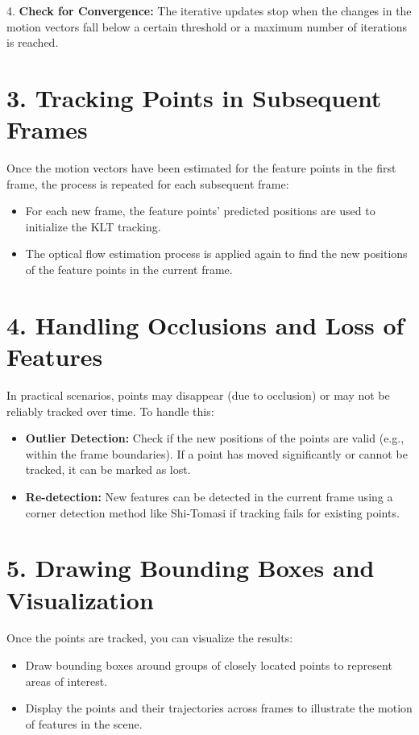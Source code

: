 \documentclass{article}
\begin{document}
4. \textbf{Check for Convergence:} The iterative updates stop when the changes in the motion vectors fall below a certain threshold or a maximum number of iterations is reached.

\section{3. Tracking Points in Subsequent Frames}
Once the motion vectors have been estimated for the feature points in the first frame, the process is repeated for each subsequent frame:

\begin{itemize}
    \item For each new frame, the feature points' predicted positions are used to initialize the KLT tracking.
    \item The optical flow estimation process is applied again to find the new positions of the feature points in the current frame.
\end{itemize}

\section{4. Handling Occlusions and Loss of Features}
In practical scenarios, points may disappear (due to occlusion) or may not be reliably tracked over time. To handle this:

\begin{itemize}
    \item \textbf{Outlier Detection:} Check if the new positions of the points are valid (e.g., within the frame boundaries). If a point has moved significantly or cannot be tracked, it can be marked as lost.
    \item \textbf{Re-detection:} New features can be detected in the current frame using a corner detection method like Shi-Tomasi if tracking fails for existing points.
\end{itemize}

\section{5. Drawing Bounding Boxes and Visualization}
Once the points are tracked, you can visualize the results:

\begin{itemize}
    \item Draw bounding boxes around groups of closely located points to represent areas of interest.
    \item Display the points and their trajectories across frames to illustrate the motion of features in the scene.
\end{itemize}
\end{document}
